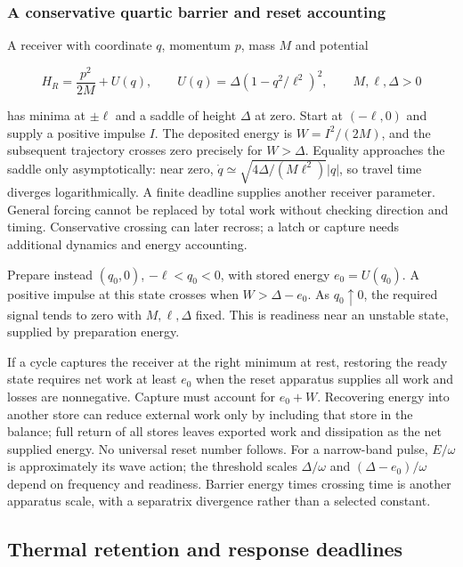 \documentclass[11pt,a4paper]{article}
\begin{document}
\hypertarget{a-conservative-quartic-barrier-and-reset-accounting}{%
\subsubsection{A conservative quartic barrier and reset
accounting}\label{a-conservative-quartic-barrier-and-reset-accounting}}

A receiver with coordinate \(q\), momentum \(p\), mass \(M\) and
potential

\[H_R=\frac{p^2}{2M}+U(q),\qquad
 U(q)=\Delta(1-q^2/\ell^2)^2,\qquad M,\ell,\Delta>0\]

has minima at \(\pm\ell\) and a saddle of height \(\Delta\) at zero.
Start at \((-\ell,0)\) and supply a positive impulse \(I\). The
deposited energy is \(W=I^2/(2M)\), and the subsequent trajectory
crosses zero precisely for \(W>\Delta\). Equality approaches the saddle
only asymptotically: near zero,
\(\dot q\simeq\sqrt{4\Delta/(M\ell^2)}|q|\), so travel time diverges
logarithmically. A finite deadline supplies another receiver parameter.
General forcing cannot be replaced by total work without checking
direction and timing. Conservative crossing can later recross; a latch
or capture needs additional dynamics and energy accounting.

Prepare instead \((q_0,0)\), \(-\ell<q_0<0\), with stored energy
\(e_0=U(q_0)\). A positive impulse at this state crosses when
\(W>\Delta-e_0\). As \(q_0\uparrow0\), the required signal tends to zero
with \(M,\ell,\Delta\) fixed. This is readiness near an unstable state,
supplied by preparation energy.

If a cycle captures the receiver at the right minimum at rest, restoring
the ready state requires net work at least \(e_0\) when the reset
apparatus supplies all work and losses are nonnegative. Capture must
account for \(e_0+W\). Recovering energy into another store can reduce
external work only by including that store in the balance; full return
of all stores leaves exported work and dissipation as the net supplied
energy. No universal reset number follows. For a narrow-band pulse,
\(E/\omega\) is approximately its wave action; the threshold scales
\(\Delta/\omega\) and \((\Delta-e_0)/\omega\) depend on frequency and
readiness. Barrier energy times crossing time is another apparatus
scale, with a separatrix divergence rather than a selected constant.

\hypertarget{thermal-retention-and-response-deadlines}{%
\subsection{Thermal retention and response
deadlines}\label{thermal-retention-and-response-deadlines}}
\end{document}
